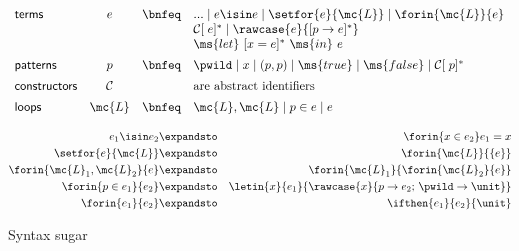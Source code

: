 \documentclass[preprint]{sigplanconf}
\renewcommand{\pipe}{\mathrel{\mid}} %
\begin{document}
\begin{figure}
  \[\begin{array}{lccl}
  \textsf{terms} &
  e &\bnfeq& ... \pipe e \isin e \pipe \setfor{e}{\mc{L}}
             \pipe \forin{\mc{L}}{e}\\
  &&& \mathcal{C}[\;e]^* \pipe \rawcase{e}{[{p} \to {e}]^*}\\
  &&& \ms{let}~ [x = e]^* ~\ms{in}~ e
  \vspace{0.5em}\\
  \textsf{patterns} &
  p &\bnfeq& \pwild \pipe x \pipe (p,p)
             \pipe \ms{true} \pipe \ms{false} \pipe \mathcal{C}[\;p]^*
  \vspace{0.5em}\\
  \textsf{constructors} & \mathcal{C} && \text{are abstract identifiers}
  \vspace{0.5em}\\
  \textsf{loops} &
  \mc{L} &\bnfeq& \mc{L}, \mc{L} \pipe p \in e \pipe e
  \end{array}\]



  \begin{eqnarray*}
    e_1 \isin e_2            &\expandsto& \forin{x \in e_2} e_1 = x\\
    \setfor{e}{\mc{L}}       &\expandsto& \forin{\mc{L}}{\{e\}}\\
    \forin{\mc{L}_1,\mc{L}_2}{e}
    &\expandsto& \forin{\mc{L}_1}{\forin{\mc{L}_2}{e}}\\
    \forin{p\in e_1}{e_2}
    &\expandsto& \letin{x}{e_1}{\rawcase{x}{p \to e_2;\,\pwild \to \unit}}\\
    \forin{e_1}{e_2} &\expandsto& \ifthen{e_1}{e_2}{\unit}%
  \end{eqnarray*}
  \caption{Syntax sugar}
\end{figure}
\end{document}
